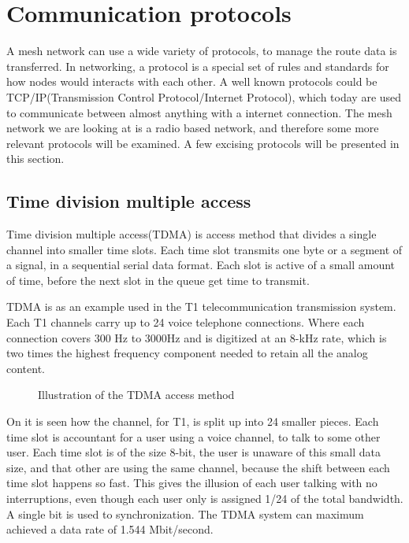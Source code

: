 \section{Communication protocols}
A mesh network can use a wide variety of protocols, to manage the route data is transferred.
In networking, a protocol is a special set of rules and standards for how nodes would interacts with each other.
A well known protocols could be TCP/IP(Transmission Control Protocol/Internet Protocol), which today are used to communicate between almost anything with a internet connection.
The mesh network we are looking at is a radio based network, and therefore some more relevant protocols will be examined. 
A few excising protocols will be presented in this section.

\subsection{Time division multiple access}
Time division multiple access(TDMA) is access method that divides a single channel into smaller time slots.
Each time slot transmits one byte or a segment of a signal, in a sequential serial data format.
Each slot is active of a small amount of time, before the next slot in the queue get time to transmit\cite{TDMA}.

TDMA is as an example used in the T1 telecommunication transmission system.
Each T1 channels carry up to 24 voice telephone connections.
Where each connection covers 300 Hz to 3000Hz and is digitized at an 8-kHz rate, which is two times the highest frequency component needed to retain all the analog content.
\begin{figure}[!h]
	\centering
	\caption{Illustration of the TDMA access method}
	\label{fig:TDMAfigure}
\end{figure}

On  it is seen how the channel, for T1, is split up into 24 smaller pieces.
Each time slot is accountant for a user using a voice channel, to talk to some other user.
Each time slot is of the size 8-bit, the user is unaware of this small data size, and that other are using the same channel, because the shift between each time slot happens so fast.
This gives the illusion of each user talking with no interruptions, even though each user only is assigned 1/24 of the total bandwidth.
A single bit is used to synchronization.
The TDMA system can maximum achieved a data rate of 1.544 Mbit/second\cite{TDMA}.


